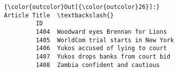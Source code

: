 \documentclass[11pt]{article}
\begin{document}
\begin{Verbatim}[commandchars=\\\{\}]
{\color{outcolor}Out[{\color{outcolor}26}]:}                           Article Title  \textbackslash{}
         ID                                        
         1404  Woodward eyes Brennan for Lions     
         1405  WorldCom trial starts in New York   
         1406  Yukos accused of lying to court     
         1407  Yukos drops banks from court bid    
         1408  Zambia confident and cautious       
         
                                                                                                                                                                                                                                                                                                                                                                                                                                                                                                                                                                                                                                                                                                                                                                                                                                                                                                                                                                                                                                                                                                                                                                                                                                                                                                                                                                                                                                                                                                                                                                                                                                                                                                                                                                                                                                                                                                                                                                                                                                                                                                                                                                                                                                                                                                                                                                                                                                                                                                                                                                                                                                                                                                                                                                                                                                                         
\end{Verbatim}
\end{document}
